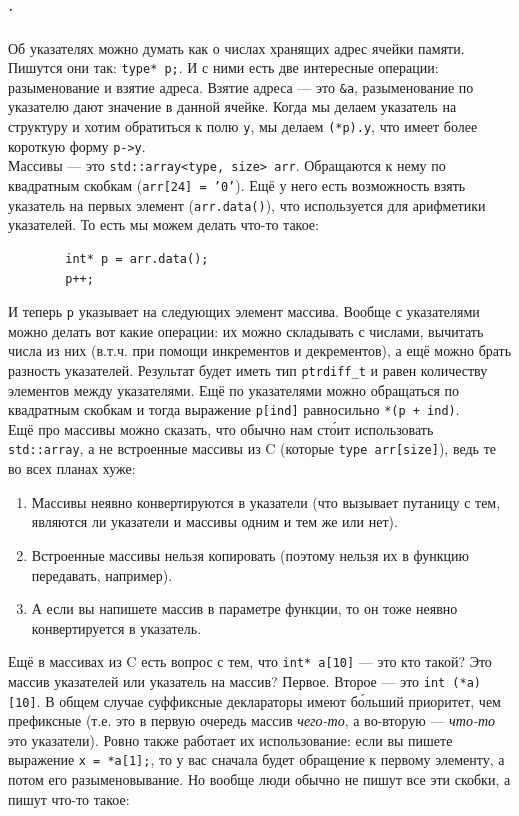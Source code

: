\documentclass{article}
\begin{document}
    \subparagraph{.}
    Об указателях можно думать как о числах хранящих адрес ячейки памяти. Пишутся они так: \texttt{type* p;}. И с ними есть две интересные операции: разыменование и взятие адреса. Взятие адреса --- это \texttt{&a}, разыменование по указателю дают значение в данной ячейке. Когда мы делаем указатель на структуру и хотим обратиться к полю \texttt{y}, мы делаем \texttt{(*p).y}, что имеет более короткую форму \texttt{p->y}.\\
    Массивы --- это \texttt{std::array<type, size> arr}. Обращаются к нему по квадратным скобкам (\texttt{arr[24] = '0'}). Ещё у него есть возможность взять указатель на первых элемент (\texttt{arr.data()}), что используется для арифметики указателей. То есть мы можем делать что-то такое:
    \begin{verbatim}
        int* p = arr.data();
        p++;
    \end{verbatim}
    И теперь \texttt{p} указывает на следующих элемент массива. Вообще с указателями можно делать вот какие операции: их можно складывать с числами, вычитать числа из них (в.т.ч. при помощи инкрементов и декрементов), а ещё можно брать разность указателей. Результат будет иметь тип \texttt{ptrdiff_t} и равен количеству элементов между указателями. Ещё по указателями можно обращаться по квадратным скобкам и тогда выражение \texttt{p[ind]} равносильно \texttt{*(p + ind)}.\\
    Ещё про массивы можно сказать, что обычно нам ст\'{о}ит использовать \texttt{std::array}, а не встроенные массивы из C (которые \texttt{type arr[size]}), ведь те во всех планах хуже:
    \begin{enumerate}
        \item Массивы неявно конвертируются в указатели (что вызывает путаницу с тем, являются ли указатели и массивы одним и тем же или нет).
        \item Встроенные массивы нельзя копировать (поэтому нельзя их в функцию передавать, например).
        \item А если вы напишете массив в параметре функции, то он тоже неявно конвертируется в указатель.
    \end{enumerate}
    Ещё в массивах из C есть вопрос с тем, что \texttt{int* a[10]} --- это кто такой? Это массив указателей или указатель на массив? Первое. Второе --- это \texttt{int (*a)[10]}. В общем случае суффиксные деклараторы имеют б\'{о}льший приоритет, чем префиксные (т.е. это в первую очередь массив \textit{чего-то}, а во-вторую --- \textit{что-то} это указатели). Ровно также работает их использование: если вы пишете выражение \texttt{x = *a[1];}, то у вас сначала будет обращение к первому элементу, а потом его разыменовывание. Но вообще люди обычно не пишут все эти скобки, а пишут что-то такое:
\end{document}
